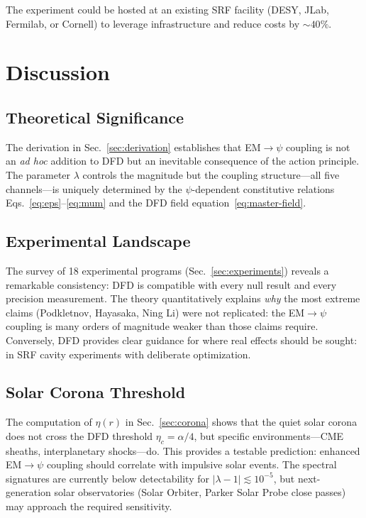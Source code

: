\documentclass[aps,prd,twocolumn,superscriptaddress,floatfix,nofootinbib]{revtex4-2}
\newcommand{\lam}{\lambda}
\begin{document}
The experiment could be hosted at an existing SRF facility (DESY, JLab,
Fermilab, or Cornell) to leverage infrastructure and reduce costs by
$\sim 40\%$.


\section{Discussion}\label{sec:discussion}

\subsection{Theoretical Significance}

The derivation in Sec.~\ref{sec:derivation} establishes that EM$\to\psi$
coupling is not an \emph{ad hoc} addition to DFD but an inevitable
consequence of the action principle. The parameter $\lambda$ controls
the magnitude but the coupling structure---all five channels---is
uniquely determined by the $\psi$-dependent constitutive relations
Eqs.~\eqref{eq:eps}--\eqref{eq:mum} and the DFD field
equation~\eqref{eq:master-field}.

\subsection{Experimental Landscape}

The survey of 18 experimental programs (Sec.~\ref{sec:experiments})
reveals a remarkable consistency: DFD is compatible with every null
result and every precision measurement. The theory quantitatively
explains \emph{why} the most extreme claims (Podkletnov, Hayasaka,
Ning Li) were not replicated: the EM$\to\psi$ coupling is many orders
of magnitude weaker than those claims require. Conversely, DFD provides
clear guidance for where real effects should be sought: in SRF
cavity experiments with deliberate optimization.

\subsection{Solar Corona Threshold}

The computation of $\eta(r)$ in Sec.~\ref{sec:corona} shows that the
quiet solar corona does not cross the DFD threshold $\eta_c = \alpha/4$,
but specific environments---CME sheaths, interplanetary shocks---do.
This provides a testable prediction: enhanced EM$\to\psi$ coupling
should correlate with impulsive solar events. The spectral signatures
are currently below detectability for $|\lam-1| \lesssim 10^{-5}$,
but next-generation solar observatories (Solar Orbiter, Parker Solar
Probe close passes) may approach the required sensitivity.
\end{document}

